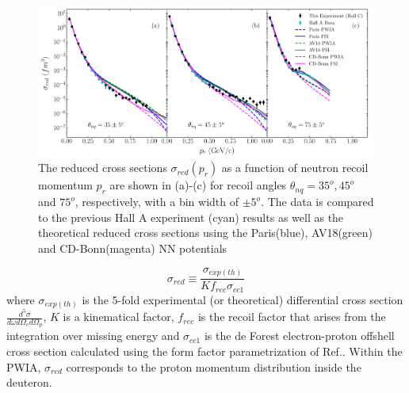 \begin{center}
\begin{figure}[hb!]
\includegraphics[scale=0.5]{../prl_plots/PRL_plot1.pdf}
\caption{The reduced cross sections $\sigma_{red}(p_{r})$ as a function of neutron recoil momentum $p_{r}$ are shown in (a)-(c) for recoil angles $\theta_{nq}=35^{o}, 45^{o}$ and $75^{o}$, respectively,
with a bin width of $\pm 5^{o}$. The data is compared to the previous Hall A experiment (cyan) results\cite{PhysRevLett.107.262501} as well as the theoretical reduced cross sections using the Paris(blue),
AV18(green) and CD-Bonn(magenta) NN potentials}
\label{fig:fig1}
\end{figure}
\end{center}
\twocolumngrid 
\begin{equation}
\sigma_{red} \equiv \frac{\sigma_{exp(th)}}{Kf_{rec}\sigma_{cc1}}
\label{eq:1}
\end{equation}
where $\sigma_{exp(th)}$ is the 5-fold experimental (or theoretical) differential cross section $\frac{d^{5}\sigma}{d\omega d\Omega_{e} d\Omega_{p}}$, $K$ is a kinematical factor, $f_{rec}$ is the recoil factor that arises from the
integration over missing energy and $\sigma_{cc1}$ is the de Forest\cite{DEFOREST1983} electron-proton offshell cross section calculated using the form factor parametrization of Ref.\cite{PhysRevC.69.022201}.
Within the PWIA, $\sigma_{red}$ corresponds to the proton momentum distribution inside the deuteron. \\
